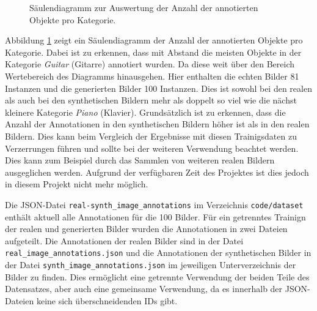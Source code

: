 \begin{figure}
{
    }
    \caption{Säulendiagramm zur Auswertung der Anzahl der annotierten Objekte pro Kategorie.}
    \label{fig:annotation_bar_chart}
\end{figure}

Abbildung \ref{fig:annotation_bar_chart} zeigt ein Säulendiagramm der Anzahl der annotierten Objekte pro Kategorie. Dabei ist zu erkennen, dass mit Abstand die meisten Objekte in der Kategorie \emph{Guitar} (Gitarre) annotiert wurden. Da diese weit über den Bereich Wertebereich des Diagramms hinausgehen. Hier enthalten die echten Bilder 81 Instanzen und die generierten Bilder 100 Instanzen. Dies ist sowohl bei den realen als auch bei den synthetischen Bildern mehr als doppelt so viel wie die nächst kleinere Kategorie \emph{Piano} (Klavier). Grundsätzlich ist zu erkennen, dass die Anzahl der Annotationen in den synthetischen Bildern höher ist als in den realen Bildern. Dies kann beim Vergleich der Ergebnisse mit diesen Trainigsdaten zu Verzerrungen führen und sollte bei der weiteren Verwendung beachtet werden. Dies kann zum Beispiel durch das Sammlen von weiteren realen Bildern ausgeglichen werden. Aufgrund der verfügbaren Zeit des Projektes ist dies jedoch in diesem Projekt nicht mehr möglich.

Die JSON-Datei \texttt{real-synth\_image\_annotations} im Verzeichnis \texttt{code/dataset} enthält aktuell alle Annotationen für die 100 Bilder. Für ein getrenntes Trainign der realen und generierten Bilder wurden die Annotationen in zwei Dateien aufgeteilt. Die Annotationen der realen Bilder sind in der Datei \texttt{real\_image\_annotations.json} und die Annotationen der synthetischen Bilder in der Datei \texttt{synth\_image\_annotations.json} im jeweiligen Unterverzeichnis der Bilder zu finden.
Dies ermöglicht eine getrennte Verwendung der beiden Teile des Datensatzes, aber auch eine gemeinsame Verwendung, da es innerhalb der JSON-Dateien keine sich überschneidenden IDs gibt.

